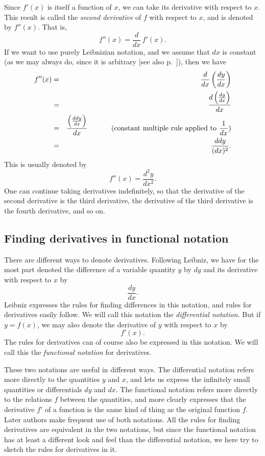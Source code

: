 \documentclass[polutonikogreek,english,twoside,openright]{article}
\begin{document}
Since $f'(x)$ is itself a function of $x$, we can take its derivative
with respect to $x$.  This result is called the {\em second
  derivative} of $f$ with respect to $x$, and is denoted by $f''(x).$
That is,
$$f''(x) =  \frac{d}{dx}\,f'(x).$$
If we want to use purely Leibnizian notation, and we assume that $dx$
is constant (as we may always do, since it is arbitrary [see also p.\
\pageref{dx_constant}]), then we have
\begin{eqnarray*}
  f''(x) & = & \frac{d}{dx}\left(\frac{dy}{dx}\right)\\
         & = & \frac{d\left(\frac{dy}{dx}\right)}{dx}\\
         & = & \frac{\left(\frac{ddy}{dx}\right)}{dx}\mbox{\hspace{3em} (constant multiple rule applied to } \frac{1}{dx})\\
         & = & \frac{ddy}{(dx)^2}.
\end{eqnarray*}
This is usually denoted by
$$f''(x) = \frac{d^2y}{dx^2}.$$
One can continue taking derivatives indefinitely, so that the
derivative of the second derivative is the third derivative, the
derivative of the third derivative is the fourth derivative, and so
on.

\subsection*{Finding derivatives in functional notation}

There are different ways to denote derivatives.  Following Leibniz, we
have for the most part denoted the difference of a variable quantity
$y$ by $dy$ and its derivative with respect to $x$ by
$$\frac{dy}{dx}.$$
Leibniz expresses the rules for finding differences in this notation,
and rules for derivatives easily follow.  We will call this notation
the {\em differential notation}.  But if $y =f(x)$, we may also
denote the derivative of $y$ with respect to $x$ by
$$f'(x).$$
The rules for derivatives can of course also be expressed in this
notation.  We will call this the {\em functional notation} for
derivatives.

These two notations are useful in different ways.  The differential
notation refers more directly to the quantities $y$ and $x$, and lets
us express the infinitely small quantities or differentials $dy$ and
$dx$.  The functional notation refers more directly to the relations
$f$ between the quantities, and more clearly expresses that the
derivative $f'$ of a function is the same kind of thing as the
original function $f.$ Later authors make frequent use of both
notations.  All the rules for finding derivatives are equivalent in
the two notations, but since the functional notation has at least a
different look and feel than the differential notation, we here try to
sketch the rules for derivatives in it.
\end{document}
